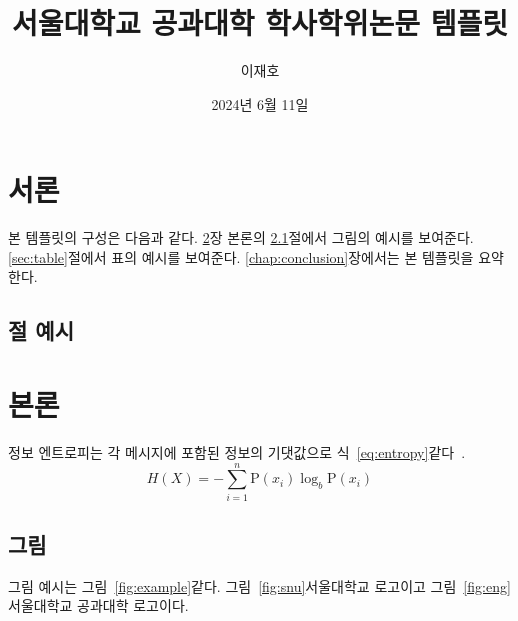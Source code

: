 \documentclass[ko]{snu-cse-bsc-thesis}
\title{서울대학교 공과대학 학사학위논문 템플릿}
\author{이재호}
\date{2024년 6월 11일}
\begin{document}
\maketitle

\begin{abstract}
  \jiwon[1]
\end{abstract}

\tableofcontents
\listoftables
\listoffigures

\chapter{서론}\label{chap:introduction}
본 템플릿의 구성은 다음과 같다.
\ref{chap:body}장 본론의 \ref{sec:picture}절에서 그림의 예시를 보여준다.
\ref{sec:table}절에서 표의 예시를 보여준다.
\ref{chap:conclusion}장에서는 본 템플릿을 요약한다.

\section{절 예시}\label{sec:section}
\jiwon[2-3]


\chapter{본론}\label{chap:body}
정보 엔트로피는 각 메시지에 포함된 정보의 기댓값으로 식~\eqref{eq:entropy}\와 같다~\cite{6773024}.
\begin{equation}\label{eq:entropy}
  H(X) = -\sum_{i=1}^n {\mathrm{P}(x_i) \log_b \mathrm{P}(x_i)}
\end{equation}

\jiwon[4-6]


\section{그림}\label{sec:picture}
그림 예시는 그림~\ref{fig:example}\와 같다. 그림~\ref{fig:snu}\은 서울대학교 로고이고 그림~\ref{fig:eng}\는 서울대학교 공과대학 로고이다.
\end{document}
